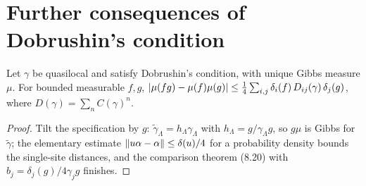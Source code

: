 \section{Further consequences of Dobrushin's condition}

\begin{proposition}[Georgii (8.34)]
    \label{prop:dob-8-34}
    \leanok

    Let $\gamma$ be quasilocal and satisfy Dobrushin's condition, with unique Gibbs measure $\mu$.
    For bounded measurable $f, g$,
    $\lvert \mu(fg) - \mu(f)\mu(g)\rvert \leq \tfrac14\sum_{i,j}\delta_i(f)\,D_{ij}(\gamma)\,\delta_j(g)$,
    where $D(\gamma) = \sum_n C(\gamma)^n$.
\end{proposition}
\begin{proof}
    \leanok
    Tilt the specification by $g$: $\tilde\gamma_\Lambda = h_\Lambda\gamma_\Lambda$ with
    $h_\Lambda = g/\gamma_\Lambda g$, so $g\mu$ is Gibbs for $\tilde\gamma$; the elementary estimate
    $\lVert u\alpha - \alpha\rVert \leq \delta(u)/4$ for a probability density bounds the single-site
    distances, and the comparison theorem (8.20) with $b_j = \delta_j(g)/4\gamma_j g$ finishes.
\end{proof}

